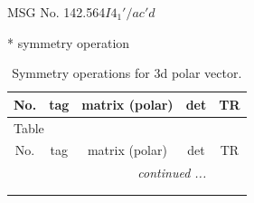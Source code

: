 \documentclass[fleqn,8pt]{jsarticle}
\begin{document}
\setcounter{MaxMatrixCols}{32}

\renewcommand{\tablename}{Table~}
\renewcommand{\figurename}{Figure~}
\begin{center}
\LARGE
MSG No. 142.564\quad$I4_{1}'/ac'd$
\end{center}
* symmetry operation
\renewcommand{\arraystretch}{1.3}
\begin{longtable}{ccccc}
\caption{Symmetry operations for 3d polar vector.}
 \\
 \hline \hline
No. & tag & matrix (polar) & det & TR \\ \hline \endfirsthead

\multicolumn{4}{l}{\tablename\ \thetable{}} \\
 \hline \hline
No. & tag & matrix (polar) & det & TR \\ \hline \endhead

 \hline \hline
\multicolumn{4}{r}{\footnotesize\it continued ...} \\ \endfoot

 \hline \hline
\multicolumn{4}{r}{} \\ \endlastfoot


\end{longtable}
\end{document}
